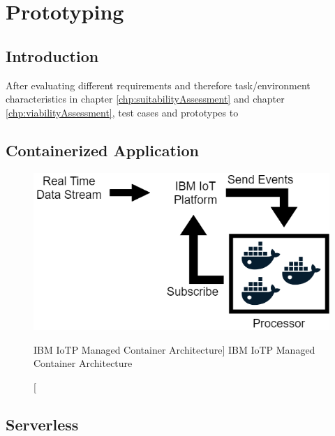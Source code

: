 \chapter{Prototyping}\label{chp:prototyping}


\section{Introduction}

After evaluating different requirements and therefore task/environment characteristics in chapter \ref{chp:suitabilityAssessment} and chapter \ref{chp:viabilityAssessment}, test cases and prototypes to 

\section{Containerized Application}

\begin{figure}[ht]
    \includegraphics[width=0.6\linewidth]{images/streaming/containerArch.png}\centering
    \caption
    [IBM IoTP Managed Container Architecture]
    {IBM IoTP Managed Container Architecture}
    \label{fig:iotpManagedContainer}
\end{figure}


\section{Serverless}

